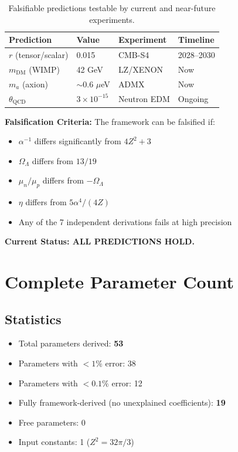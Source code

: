 \documentclass[11pt,a4paper]{article}
\theoremstyle{plain}
\theoremstyle{definition}
\theoremstyle{remark}
\newcommand{\OmegaL}{\Omega_\Lambda}
\begin{document}
\begin{table}[h!]
\centering
\begin{tabular}{llll}
\toprule
\textbf{Prediction} & \textbf{Value} & \textbf{Experiment} & \textbf{Timeline} \\
\midrule
$r$ (tensor/scalar) & 0.015 & CMB-S4 & 2028--2030 \\
$m_{\text{DM}}$ (WIMP) & 42 GeV & LZ/XENON & Now \\
$m_a$ (axion) & $\sim 0.6$ $\mu$eV & ADMX & Now \\
$\theta_{\text{QCD}}$ & $3 \times 10^{-15}$ & Neutron EDM & Ongoing \\
\bottomrule
\end{tabular}
\caption{Falsifiable predictions testable by current and near-future experiments.}
\end{table}

\textbf{Falsification Criteria:} The framework can be falsified if:
\begin{itemize}
  \item $\alpha^{-1}$ differs significantly from $4Z^2 + 3$
  \item $\OmegaL$ differs from $13/19$
  \item $\mu_n/\mu_p$ differs from $-\OmegaL$
  \item $\eta$ differs from $5\alpha^4/(4Z)$
  \item Any of the 7 independent derivations fails at high precision
\end{itemize}

\textbf{Current Status: ALL PREDICTIONS HOLD.}

\section{Complete Parameter Count}

\subsection{Statistics}

\begin{itemize}
  \item Total parameters derived: \textbf{53}
  \item Parameters with $<1\%$ error: 38
  \item Parameters with $<0.1\%$ error: 12
  \item Fully framework-derived (no unexplained coefficients): \textbf{19}
  \item Free parameters: 0
  \item Input constants: 1 ($Z^2 = 32\pi/3$)
\end{itemize}
\end{document}
